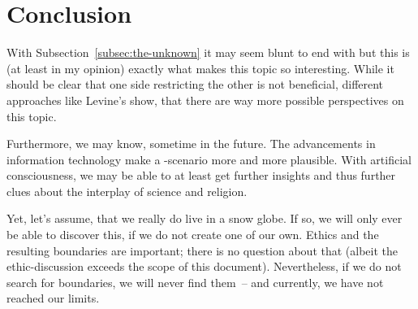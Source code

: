 \section{Conclusion}
\label{sec:Conclusion}

With Subsection~\ref{subsec:the-unknown} it may seem blunt to end with  but this is (at least in my opinion) exactly what makes this topic so interesting.
While it should be clear that one side restricting the other is not beneficial, different approaches like Levine's  show, that there are way more possible perspectives on this topic.

Furthermore, we may know, sometime in the future. The advancements in information technology make a -scenario more and more plausible.
With artificial consciousness, we may be able to at least get further insights and thus further clues about the interplay of science and religion.

Yet, let's assume, that we really do live in a snow globe. If so, we will only ever be able to discover this, if we do not create one of our own. Ethics and the resulting boundaries are important; there is no question about that (albeit the ethic-discussion exceeds the scope of this document).
Nevertheless, if we do not search for boundaries, we will never find them~-- and currently, we have not reached our limits.





